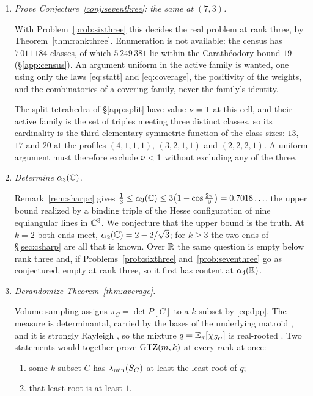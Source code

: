 \begin{enumerate}
\item\label{prob:seventhree}
\emph{Prove Conjecture~\ref{conj:seventhree}: the same at $(7,3)$.}

With Problem~\ref{prob:sixthree} this decides the real problem at rank three,
by Theorem~\ref{thm:rankthree}.  Enumeration is not available: the census has
$7\,011\,184$ classes, of which $5\,249\,381$ lie within the Carath\'eodory
bound $19$ (\S\ref{app:census}).  An argument uniform in the active family is
wanted, one using only the laws \eqref{eq:statt} and \eqref{eq:coverage}, the
positivity of the weights, and the combinatorics of a covering family, never
the family's identity.

The split tetrahedra of \S\ref{app:split} have value $\nu=1$ at this cell, and
their active family is the set of triples meeting three distinct classes, so its
cardinality is the third elementary symmetric function of the class sizes: $13$,
$17$ and $20$ at the profiles $(4,1,1,1)$, $(3,2,1,1)$ and $(2,2,2,1)$.  A
uniform argument must therefore exclude $\nu<1$ without excluding any of the
three.

\item\label{prob:sharpc}
\emph{Determine $\alpha_3(\mathbb{C})$.}

Remark~\ref{rem:sharpc} gives
$\tfrac13\le\alpha_3(\mathbb{C})\le3\bigl(1-\cos\tfrac{2\pi}{9}\bigr)=0.7018\ldots$,
the upper bound realized by a binding triple of the Hesse configuration of nine
equiangular lines in $\mathbb{C}^3$.  We conjecture that the upper bound is the truth.
At $k=2$ both ends meet, $\alpha_2(\mathbb{C})=2-2/\sqrt3$; for $k\ge3$ the two ends of
\S\ref{sec:csharp} are all that is known.  Over $\mathbb{R}$ the same question is empty
below rank three and, if Problems~\ref{prob:sixthree}
and~\ref{prob:seventhree} go as conjectured, empty at rank three, so it first
has content at $\alpha_4(\mathbb{R})$.

\item\label{prob:interlace}
\emph{Derandomize Theorem~\ref{thm:average}.}

Volume sampling \cite{DRVW2006} assigns $\pi_C=\det P[C]$ to a $k$-subset by
\eqref{eq:dpp}.  The measure is determinantal, carried by the bases of the
underlying matroid \cite{Lyons2003}, and it is strongly Rayleigh
\cite{BorceaBrandenLiggett2009}, so the mixture $q=\mathbb{E}_\pi[\chi_{S_{C}}]$ is
real-rooted \cite{AnariOveisGharan2015}.  Two statements would together prove
$\mathrm{GTZ}(m,k)$ at every rank at once:
\begin{enumerate}
\item[(a)] some $k$-subset $C$ has $\lambda_{\min}(S_{C})$ at least the least root of $q$;
\item[(b)] that least root is at least $1$.
\end{enumerate}


\end{enumerate}
